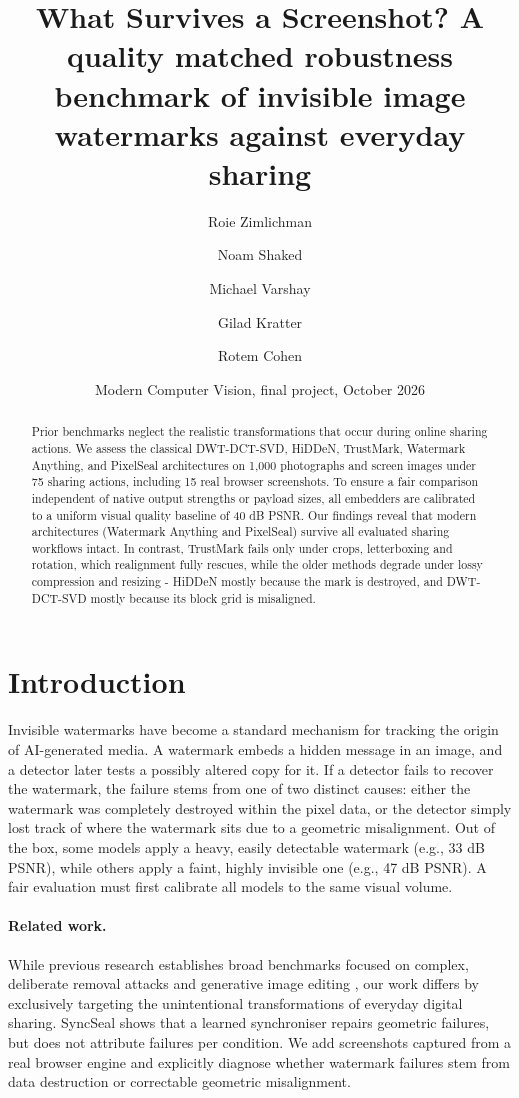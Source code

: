 \documentclass[10pt,twocolumn]{article}
\title{\textbf{What Survives a Screenshot? A quality matched robustness benchmark of invisible image watermarks against everyday sharing}}
\author{Roie Zimlichman \and Noam Shaked \and Michael Varshay \and Gilad Kratter \and Rotem Cohen}
\date{Modern Computer Vision, final project, October 2026}
\begin{document}
\maketitle

\begin{abstract}
Prior benchmarks neglect the realistic transformations that occur during online sharing actions. We assess the classical DWT-DCT-SVD, HiDDeN, TrustMark, Watermark Anything, and PixelSeal architectures on 1,000 photographs and screen images under 75 sharing actions, including 15 real browser screenshots. To ensure a fair comparison independent of native output strengths or payload sizes, all embedders are calibrated to a uniform visual quality baseline of 40 dB PSNR. Our findings reveal that modern architectures (Watermark Anything and PixelSeal) survive all evaluated sharing workflows intact. In contrast, TrustMark fails only under crops, letterboxing and rotation, which realignment fully rescues, while the older methods degrade under lossy compression and resizing - HiDDeN mostly because the mark is destroyed, and DWT-DCT-SVD mostly because its block grid is misaligned.
\end{abstract}

\section{Introduction}
Invisible watermarks have become a standard mechanism for tracking the origin of AI-generated media. A watermark embeds a hidden message in an image, and a detector later tests a possibly altered copy for it. If a detector fails to recover the watermark, the failure stems from one of two distinct causes: either the watermark was completely destroyed within the pixel data, or the detector simply lost track of where the watermark sits due to a geometric misalignment. Out of the box, some models apply a heavy, easily detectable watermark (e.g., 33 dB PSNR), while others apply a faint, highly invisible one (e.g., 47 dB PSNR). A fair evaluation must first calibrate all models to the same visual volume.

\paragraph{Related work.}
While previous research establishes broad benchmarks focused on complex, deliberate removal attacks \cite{an2024wavesbenchmarkingrobustnessimage} and generative image editing \cite{lu2025wbench}, our work differs by exclusively targeting the unintentional transformations of everyday digital sharing. SyncSeal \cite{fernandez2025syncseal} shows that a learned synchroniser repairs geometric failures, but does not attribute failures per condition. We add screenshots captured from a real browser engine and explicitly diagnose whether watermark failures stem from data destruction or correctable geometric misalignment.
\end{document}
